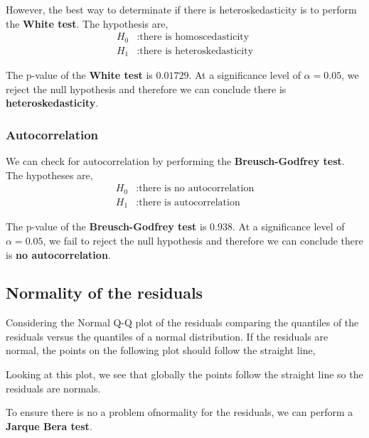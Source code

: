 However, the best way to determinate if there is heteroskedasticity is to perform the \textbf{White test}. The hypothesis are,
\begin{align*}
	H_0&: \text{there is homoscedasticity} \\
	H_1&: \text{there is heteroskedasticity}
\end{align*}


The p-value of the \textbf{White test} is $0.01729$. At a significance level of $\alpha = 0.05$, we reject the null hypothesis and therefore we can conclude there is \textbf{heteroskedasticity}.


\subsubsection{Autocorrelation}

We can check for autocorrelation by performing the \textbf{Breusch-Godfrey test}. The hypotheses are,
\begin{align*}
	H_0&: \text{there is no autocorrelation} \\
	H_1&: \text{there is autocorrelation}
\end{align*}


The p-value of the \textbf{Breusch-Godfrey test} is $0.938$. At a significance level of $\alpha = 0.05$, we fail to reject the null hypothesis and therefore we can conclude there is \textbf{no autocorrelation}. 

\subsection{Normality of the residuals}

Considering the Normal Q-Q plot of the residuals comparing the quantiles of the residuals versus the quantiles of a normal distribution. If the residuals are normal, the points on the following plot should follow the straight line,


Looking at this plot, we see that globally the points follow the straight line so the residuals are normals.  

To ensure there is no a problem ofnormality for the residuals, we can perform a \textbf{Jarque Bera test}. 

